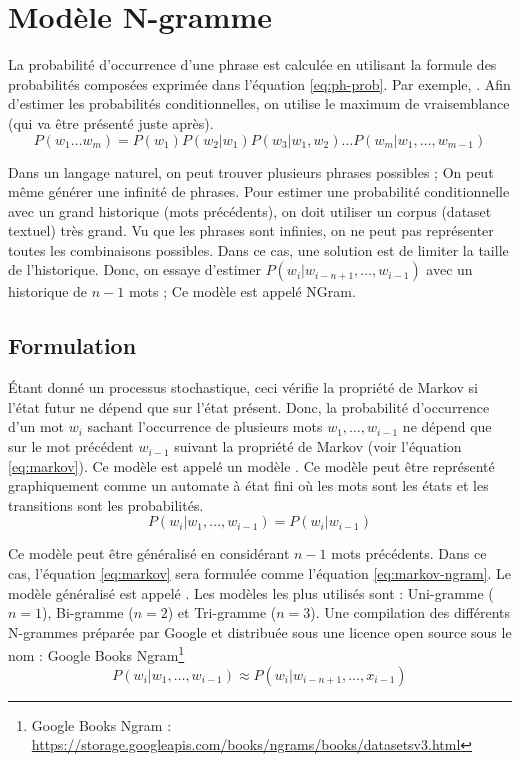 \documentclass{KodeBook}
\begin{document}
\section{Modèle N-gramme}

La probabilité d'occurrence d'une phrase est calculée en utilisant la formule des probabilités composées exprimée dans l'équation \ref{eq:ph-prob}.
Par exemple, .
Afin d'estimer les probabilités conditionnelles, on utilise le maximum de vraisemblance (qui va être présenté juste après).
\begin{equation}\label{eq:ph-prob}
	P(w_1 \ldots w_m) =  P(w_1) P(w_2 | w_1) P(w_3 | w_1, w_2) \ldots P(w_m | w_1, \ldots, w_{m-1})
\end{equation}

Dans un langage naturel, on peut trouver plusieurs phrases possibles ; On peut même générer une infinité de phrases.
Pour estimer une probabilité conditionnelle avec un grand historique (mots précédents), on doit utiliser un corpus (dataset textuel) très grand. 
Vu que les phrases sont infinies, on ne peut pas représenter toutes les combinaisons possibles. 
Dans ce cas, une solution est de limiter la taille de l'historique. 
Donc, on essaye d'estimer $P(w_i|w_{i-n+1},\ldots,w_{i-1})$ avec un historique de $n-1$ mots ; 
Ce modèle est appelé NGram.

\subsection{Formulation}

Étant donné un processus stochastique, ceci vérifie la propriété de Markov si l'état futur ne dépend que sur l'état présent. 
Donc, la probabilité d'occurrence d'un mot $w_i$ sachant l'occurrence de plusieurs mots $w_1, \ldots, w_{i-1}$ ne dépend que sur le mot précédent $w_{i-1}$ suivant la propriété de Markov (voir l'équation \ref{eq:markov}). 
Ce modèle est appelé un modèle .
Ce modèle peut être représenté graphiquement comme un automate à état fini où les mots sont les états et les transitions sont les probabilités.
\begin{equation}
	P(w_i | w_1,\ldots, w_{i-1}) = P(w_i | w_{i-1})
	\label{eq:markov}
\end{equation}

Ce modèle peut être généralisé en considérant $n-1$ mots précédents. 
Dans ce cas, l'équation \ref{eq:markov} sera formulée comme l'équation \ref{eq:markov-ngram}.
Le modèle généralisé est appelé .
Les modèles les plus utilisés sont : Uni-gramme ($n=1$), Bi-gramme ($n=2$) et Tri-gramme ($n=3$).
Une compilation des différents N-grammes préparée par Google et distribuée sous une licence open source sous le nom : Google Books Ngram\footnote{Google Books Ngram : \url{https://storage.googleapis.com/books/ngrams/books/datasetsv3.html}}
\begin{equation}
	P(w_i | w_1,\ldots, w_{i-1}) \approx P(w_i | w_{i-n+1}, \ldots, x_{i-1})
	\label{eq:markov-ngram}
\end{equation}
\end{document}
